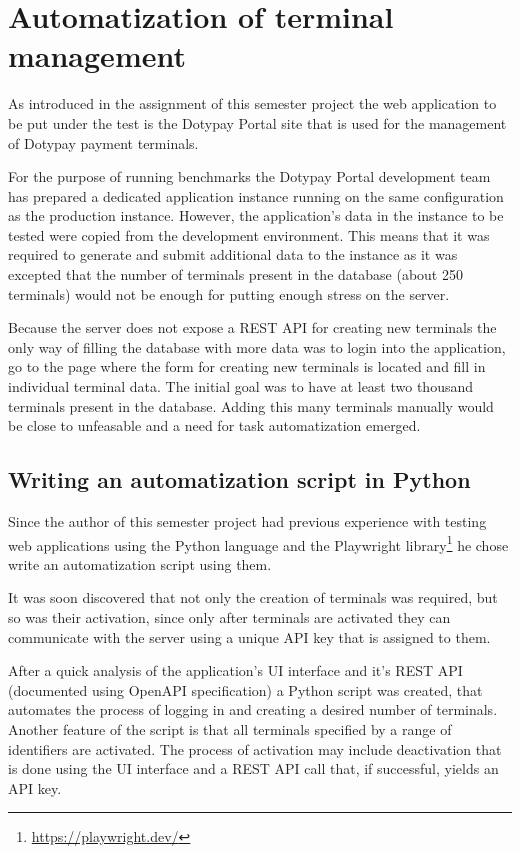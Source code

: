 \documentclass[12pt, a4paper]{article}
\let\oldsection\section
\renewcommand\section{\clearpage\oldsection}
\begin{document}
\section{Automatization of terminal management}
As introduced in the assignment of this semester project the web application to be put under the test is the Dotypay Portal site that is used for the management of Dotypay payment terminals.

For the purpose of running benchmarks the Dotypay Portal development team has prepared a dedicated application instance running on the same configuration as the production instance.
However, the application's data in the instance to be tested were copied from the development environment.
This means that it was required to generate and submit additional data to the instance as it was excepted that the number of terminals present in the database (about 250 terminals)  would not be enough for putting enough stress on the server.

Because the server does not expose a REST API for creating new terminals the only way of filling the database with more data was to login into the application, go to the page where the form for creating new terminals is located and fill in individual terminal data. 
The initial goal was to have at least two thousand terminals present in the database.
Adding this many terminals manually would be close to unfeasable and a need for task automatization emerged.


\subsection{Writing an automatization script in Python}
Since the author of this semester project had previous experience with testing web applications using the Python language and the Playwright library\footnote{\url{https://playwright.dev/}} he chose write an automatization script using them.

It was soon discovered that not only the creation of terminals was required, but so was their activation, since only after terminals are activated they can communicate with the server using a unique API key that is assigned to them.

After a quick analysis of the application's UI interface and it's REST API (documented using OpenAPI specification) a Python script was created, that automates the process of logging in and creating a desired number of terminals.
Another feature of the script is that all terminals specified by a range of identifiers are activated.
The process of activation may include deactivation that is done using the UI interface and a REST API call that, if successful, yields an API key.
\end{document}
